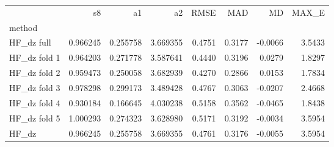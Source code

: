 \begin{tabular}{lrrrrrrr}
 & s8 & a1 & a2 & RMSE & MAD & MD & MAX_E \\
method &  &  &  &  &  &  &  \\
HF_dz full & 0.966245 & 0.255758 & 3.669355 & 0.4751 & 0.3177 & -0.0066 & 3.5433 \\
HF_dz fold 1 & 0.964203 & 0.271778 & 3.587641 & 0.4440 & 0.3196 & 0.0279 & 1.8297 \\
HF_dz fold 2 & 0.959473 & 0.250058 & 3.682939 & 0.4270 & 0.2866 & 0.0153 & 1.7834 \\
HF_dz fold 3 & 0.978298 & 0.299173 & 3.489428 & 0.4767 & 0.3063 & -0.0207 & 2.4668 \\
HF_dz fold 4 & 0.930184 & 0.166645 & 4.030238 & 0.5158 & 0.3562 & -0.0465 & 1.8438 \\
HF_dz fold 5 & 1.000293 & 0.274323 & 3.628980 & 0.5171 & 0.3192 & -0.0034 & 3.5954 \\
HF_dz & 0.966245 & 0.255758 & 3.669355 & 0.4761 & 0.3176 & -0.0055 & 3.5954 \\
\end{tabular}
